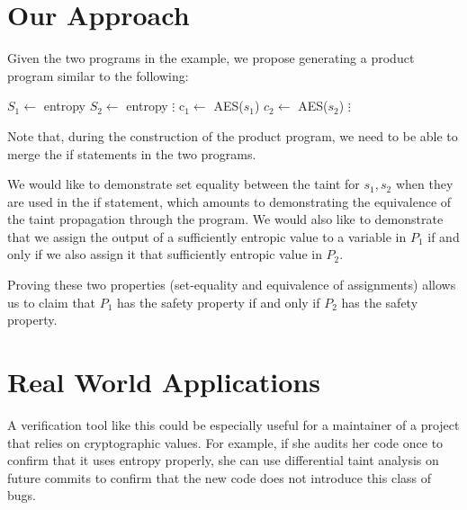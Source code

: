 \documentclass[letterpaper,twocolumn,10pt]{article}
\begin{document}

\section{Our Approach}
Given the two programs in the example, we propose generating a product program similar to the following:

\begin{algorithmic}
\State $S_1 \gets$ entropy
\State $S_2 \gets$ entropy
\State $\vdots$
\State c$_1 \gets$ AES($s_1$)
\State $c_2 \gets$ AES($s_2$)
\EndIf
\State $\vdots$
\EndFunction
\end{algorithmic}

Note that, during the construction of the product program, we need to be able to merge the if statements in the two programs. 

We would like to demonstrate set equality between the taint for $s_1, s_2$ when they are used in the if statement, which amounts to demonstrating the equivalence of the taint propagation through the program. We would also like to demonstrate that we assign the output of a sufficiently entropic value to a variable in $P_1$ if and only if we also assign it that sufficiently entropic value in $P_2$.

Proving these two properties (set-equality and equivalence of assignments) allows us to claim that $P_1$ has the safety property if and only if $P_2$ has the safety property.

\section{Real World Applications}

A verification tool like this could be especially useful for a maintainer of a project that relies on cryptographic values. For example, if she audits her code once to confirm that it uses entropy properly, she can use differential taint analysis on future commits to confirm that the new code does not introduce this class of bugs. %
\end{document}
